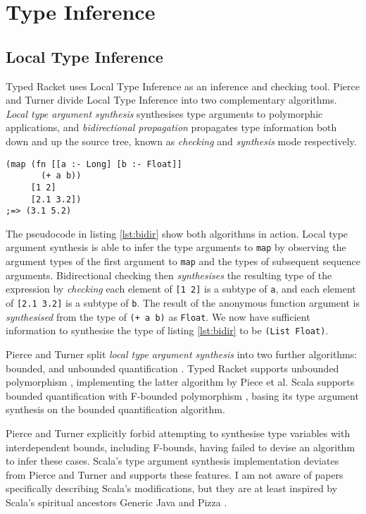 \section{Type Inference}

\subsection{Local Type Inference}

Typed Racket uses Local Type Inference \cite{PT00}
as an inference and checking tool. Pierce and Turner
\cite{PT00} divide Local Type Inference into
two complementary algorithms. \emph{Local type argument synthesis}
synthesises type arguments to polymorphic applications, and \emph{bidirectional
propagation} propagates type information both down and up the source tree,
known as \emph{checking} and \emph{synthesis} mode respectively.

\begin{lstlisting}[caption=Bidirectional checking algorithm with Typed Clojure pseudocode, label=lst:bidir]
(map (fn [[a :- Long] [b :- Float]]
       (+ a b))
     [1 2]
     [2.1 3.2])
;=> (3.1 5.2)
\end{lstlisting}

The pseudocode in listing \ref{lst:bidir} show both algorithms in action. Local type argument synthesis is able
to infer the type arguments to \lstinline|map| by observing the argument types of the first
argument to \lstinline|map| and the types of subsequent sequence arguments. Bidirectional checking
then \emph{synthesises} the resulting type of the expression by \emph{checking} each element
of \lstinline|[1 2]| is a subtype of \lstinline|a|, and each element of \lstinline|[2.1 3.2]| is a subtype of
\lstinline|b|. The result of the anonymous function argument is \emph{synthesised} from the type of
\lstinline|(+ a b)| as \lstinline|Float|. We now have sufficient information to 
synthesise the type of listing \ref{lst:bidir} to be \lstinline|(List Float)|.

Pierce and Turner split \emph{local type argument synthesis} into two further
algorithms: bounded, and unbounded quantification \cite{PT00}. 
Typed Racket 
supports unbounded polymorphism \cite{Tob10}, implementing the latter algorithm by Piece et al.
Scala supports bounded quantification with F-bounded polymorphism \cite{CCHOM89},
basing its type argument synthesis on the bounded quantification algorithm.

Pierce and Turner explicitly forbid \cite{PT00}
attempting to synthesise type variables with interdependent bounds, including
F-bounds, having failed to devise an algorithm to infer these cases.
Scala's type argument synthesis implementation deviates from Pierce and Turner and supports these features.
I am not aware of papers specifically describing Scala's modifications, but they are at least inspired by
Scala's spiritual ancestors Generic Java \cite{BOSW98} and Pizza \cite{OW97}.

